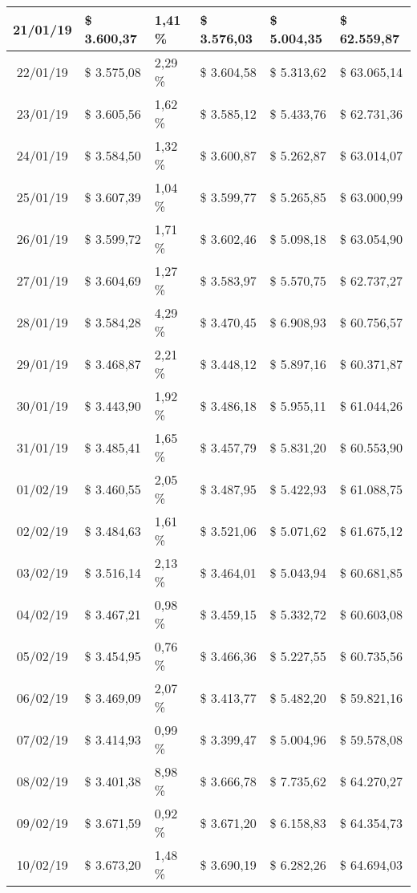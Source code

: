 \begin{small}
\begin{longtable}{|c|l|l|l|l|l|}
21/01/19 & \$ 3.600,37 & 1,41 \% & \$ 3.576,03 & \$ 5.004,35 & \$ 62.559,87 \\ \hline
22/01/19 & \$ 3.575,08 & 2,29 \% & \$ 3.604,58 & \$ 5.313,62 & \$ 63.065,14 \\ \hline
23/01/19 & \$ 3.605,56 & 1,62 \% & \$ 3.585,12 & \$ 5.433,76 & \$ 62.731,36 \\ \hline
24/01/19 & \$ 3.584,50 & 1,32 \% & \$ 3.600,87 & \$ 5.262,87 & \$ 63.014,07 \\ \hline
25/01/19 & \$ 3.607,39 & 1,04 \% & \$ 3.599,77 & \$ 5.265,85 & \$ 63.000,99 \\ \hline
26/01/19 & \$ 3.599,72 & 1,71 \% & \$ 3.602,46 & \$ 5.098,18 & \$ 63.054,90 \\ \hline
27/01/19 & \$ 3.604,69 & 1,27 \% & \$ 3.583,97 & \$ 5.570,75 & \$ 62.737,27 \\ \hline
28/01/19 & \$ 3.584,28 & 4,29 \% & \$ 3.470,45 & \$ 6.908,93 & \$ 60.756,57 \\ \hline
29/01/19 & \$ 3.468,87 & 2,21 \% & \$ 3.448,12 & \$ 5.897,16 & \$ 60.371,87 \\ \hline
30/01/19 & \$ 3.443,90 & 1,92 \% & \$ 3.486,18 & \$ 5.955,11 & \$ 61.044,26 \\ \hline
31/01/19 & \$ 3.485,41 & 1,65 \% & \$ 3.457,79 & \$ 5.831,20 & \$ 60.553,90 \\ \hline
01/02/19 & \$ 3.460,55 & 2,05 \% & \$ 3.487,95 & \$ 5.422,93 & \$ 61.088,75 \\ \hline
02/02/19 & \$ 3.484,63 & 1,61 \% & \$ 3.521,06 & \$ 5.071,62 & \$ 61.675,12 \\ \hline
03/02/19 & \$ 3.516,14 & 2,13 \% & \$ 3.464,01 & \$ 5.043,94 & \$ 60.681,85 \\ \hline
04/02/19 & \$ 3.467,21 & 0,98 \% & \$ 3.459,15 & \$ 5.332,72 & \$ 60.603,08 \\ \hline
05/02/19 & \$ 3.454,95 & 0,76 \% & \$ 3.466,36 & \$ 5.227,55 & \$ 60.735,56 \\ \hline
06/02/19 & \$ 3.469,09 & 2,07 \% & \$ 3.413,77 & \$ 5.482,20 & \$ 59.821,16 \\ \hline
07/02/19 & \$ 3.414,93 & 0,99 \% & \$ 3.399,47 & \$ 5.004,96 & \$ 59.578,08 \\ \hline
08/02/19 & \$ 3.401,38 & 8,98 \% & \$ 3.666,78 & \$ 7.735,62 & \$ 64.270,27 \\ \hline
09/02/19 & \$ 3.671,59 & 0,92 \% & \$ 3.671,20 & \$ 6.158,83 & \$ 64.354,73 \\ \hline
10/02/19 & \$ 3.673,20 & 1,48 \% & \$ 3.690,19 & \$ 6.282,26 & \$ 64.694,03 \\ \hline

\end{longtable}
\end{small}
